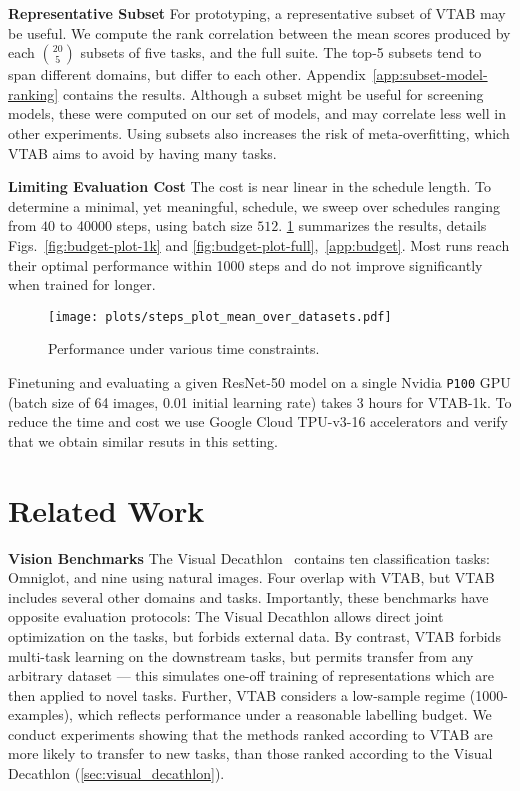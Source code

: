 \documentclass{article}
\newcommand{\myparagraph}[1]{\noindent\textbf{#1}\quad}
\begin{document}
\myparagraph{Representative Subset}
For prototyping, a representative subset of VTAB may be useful.
We compute the rank correlation between the mean scores produced by each $\binom{20}{5}$  subsets of five tasks, and the full suite.
The top-5 subsets tend to span different domains, but differ to each other.
Appendix~\ref{app:subset-model-ranking} contains the results.
Although a subset might be useful for screening models, these were computed on our set of models, and may correlate less well in other experiments.
Using subsets also increases the risk of meta-overfitting, which VTAB aims to avoid by having many tasks.

\myparagraph{Limiting Evaluation Cost}
The cost is near linear in the schedule length.
To determine a minimal, yet meaningful, schedule, we sweep over schedules ranging from $40$ to \num{40000} steps, using batch size $512$.
\cref{fig:budget-plot-mean} summarizes the results, details Figs.~\ref{fig:budget-plot-1k} and \ref{fig:budget-plot-full},~\cref{app:budget}.
Most runs reach their optimal performance within \num{1000} steps and do not improve significantly when trained for longer.

\begin{figure}
  \centering
  \texttt{[image: plots/steps\_plot\_mean\_over\_datasets.pdf]}
  \vspace{-10pt}
  \caption{Performance under various time constraints.}
  \label{fig:budget-plot-mean}
  \vspace{-15pt}
\end{figure}

Finetuning and evaluating a given ResNet-50 model on a single Nvidia \texttt{P100} GPU (batch size of 64 images, 0.01 initial learning rate) takes 3 hours for VTAB-1k.
To reduce the time and cost we use Google Cloud TPU-v3-16 accelerators and verify that we obtain similar resuts in this setting.



\section{Related Work \label{sec:related_work}}

\myparagraph{Vision Benchmarks}
The Visual Decathlon~\citep{rebuffi2017} contains ten classification tasks: 
Omniglot, and nine using natural images. 
Four overlap with VTAB, but VTAB includes several other domains and tasks.
Importantly, these benchmarks have opposite evaluation protocols:
The Visual Decathlon allows direct joint optimization on the tasks, but forbids external data. 
By contrast, VTAB forbids multi-task learning on the downstream tasks, but permits transfer from any arbitrary dataset --- this simulates one-off training of representations which are then applied to novel tasks.
Further, VTAB considers a low-sample regime (1000-examples), which reflects performance under a reasonable labelling budget.
We conduct experiments showing that the methods ranked according to  VTAB are more likely to transfer to new tasks, than those ranked according to the Visual Decathlon (\cref{sec:visual_decathlon}).
\end{document}
